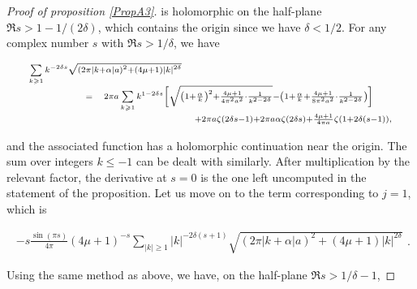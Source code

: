 \documentclass{jams-l}
\theoremstyle{definition}
\theoremstyle{remark}
\numberwithin{equation}{section}
\begin{document}
\begin{proof}[Proof of proposition \ref{PropA3}]
                \noindent is holomorphic on the half-plane $\Re s > 1 - 1/ \left( 2 \delta \right)$, which contains the origin since we have $\delta < 1/2$. For any complex number $s$ with $\Re s > 1/\delta$, we have
                
                \[ \begin{array}{lll}
                        \multicolumn{3}{l}{\scriptstyle \sum\limits_{k \geqslant 1} k^{-2 \delta s} \sqrt{\left( 2 \pi \left \vert k + \alpha \right \vert a \right)^2 + \left( 4 \mu + 1 \right) \left \vert k \right \vert^{2 \delta}}} \\[0.8em]
                        
                        \qquad \qquad & \scriptstyle = & \scriptstyle 2 \pi a \sum\limits_{k \geqslant 1} k^{1 - 2 \delta s} \left[ \sqrt{ \left( 1 + \frac{\alpha}{k} \right)^2 + \frac{4 \mu + 1}{4 \pi^2 a^2} \cdot \frac{1}{k^{2-2\delta}}} - \left( 1 + \frac{\alpha}{k} + \frac{4 \mu + 1}{8 \pi^2 a^2} \cdot \frac{1}{k^{2-2\delta}} \right) \right] \\[0.8em]
                        
                        && \scriptstyle \qquad \qquad \qquad \qquad + 2 \pi a \zeta \left( 2 \delta s - 1 \right) + 2 \pi a \alpha \zeta \left( 2 \delta s \right) + \frac{4 \mu + 1}{4 \pi a} \zeta \left( 1 + 2 \delta \left( s - 1 \right) \right),
                    \end{array} \]
                
                \noindent and the associated function has a holomorphic continuation near the origin. The sum over integers $k \leqslant -1$ can be dealt with similarly. After multiplication by the relevant factor, the derivative at $s=0$ is the one left uncomputed in the statement of the proposition. Let us move on to the term corresponding to $j=1$, which is
                
                \[ \begin{array}{lll}
                        - s \frac{\sin \left(\pi s \right)}{4\pi} \left( 4 \mu + 1 \right)^{-s} \sum\limits_{\left \vert k \right \vert \geqslant 1} \left\vert k \right \vert^{-2 \delta \left( s+1 \right)} \sqrt{\left( 2 \pi \left \vert k + \alpha \right \vert a \right)^2 + \left( 4 \mu + 1 \right) \left \vert k \right \vert^{2 \delta}}
                    \end{array} . \]
                
                \noindent Using the same method as above, we have, on the half-plane $\Re s > 1/\delta - 1$,
                

\end{proof}
\end{document}
